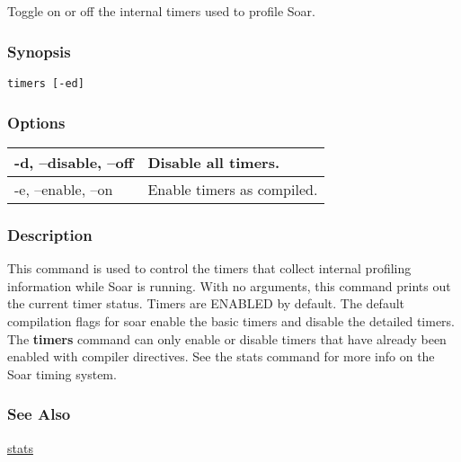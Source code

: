 \subsection{}
\label{timers}
Toggle on or off the internal timers used to profile Soar. 
\subsubsection*{Synopsis}
\begin{verbatim}
timers [-ed]
\end{verbatim}
\subsubsection*{Options}
\begin{tabular}{|l|l|}
\hline 
 -d, --disable, --off  & Disable all timers.  \\
 \hline 
 -e, --enable, --on  & Enable timers as compiled.  \\
 \hline 
\end{tabular}
\subsubsection*{Description}
 This command is used to control the timers that collect internal profiling information while Soar is running. With no arguments, this command prints out the current timer status. Timers are ENABLED by default. The default compilation flags for soar enable the basic timers and disable the detailed timers. The \textbf{timers}
 command can only enable or disable timers that have already been enabled with compiler directives. See the stats command for more info on the Soar timing system. 
\subsubsection*{See Also}
\hyperref[stats]{stats} 